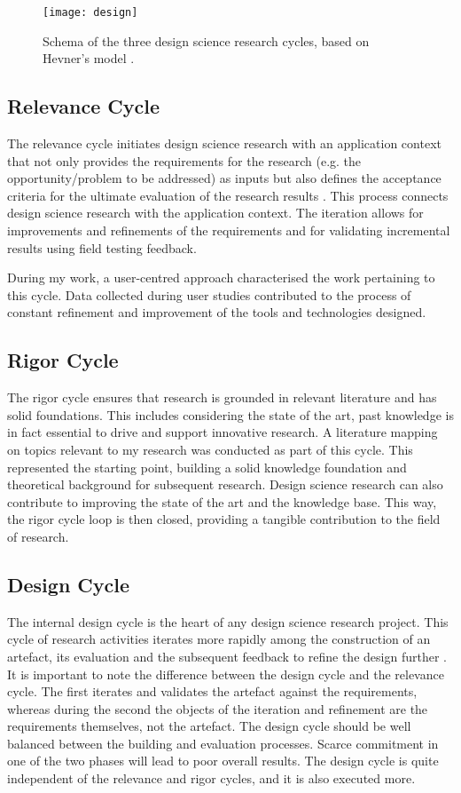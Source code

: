 \begin{figure}[ptb]
    \centering 
	\texttt{[image: design]}
	\caption{Schema of the three design science research cycles, based on Hevner's model \autocite*{hevner_three_2007}.}
	\label{fig:design-cycles}
\end{figure}


\subsection{Relevance Cycle}
The relevance cycle initiates design science research with an application context that not only provides the requirements for the research (e.g. the opportunity/problem to be addressed) as inputs but also defines the acceptance criteria for the ultimate evaluation of the research results \autocite{hevner_design_2010}.
This process connects design science research with the application context. The iteration allows for improvements and refinements of the requirements and for validating incremental results using field testing feedback.

During my work, a user-centred approach characterised the work pertaining to this cycle. Data collected during user studies contributed to the process of constant refinement and improvement of the tools and technologies designed.

\subsection{Rigor Cycle}
The rigor cycle ensures that research is grounded in relevant literature and has solid foundations. This includes considering the state of the art, past knowledge is in fact essential to drive and support innovative research. A literature mapping on topics relevant to my research was conducted as part of this cycle. This represented the starting point, building a solid knowledge foundation and theoretical background for subsequent research.
Design science research can also contribute to improving the state of the art and the knowledge base. This way, the rigor cycle loop is then closed, providing a tangible contribution to the field of research.

\subsection{Design Cycle}
The internal design cycle is the heart of any design science research project. This cycle of research activities iterates more rapidly among the construction of an artefact, its evaluation and the subsequent feedback to refine the design further \autocite{hevner_design_2010}.
It is important to note the difference between the design cycle and the relevance cycle. The first iterates and validates the artefact against the requirements, whereas during the second the objects of the iteration and refinement are the requirements themselves, not the artefact.
The design cycle should be well balanced between the building and evaluation processes. Scarce commitment in one of the two phases will lead to poor overall results.
The design cycle is quite independent of the relevance and rigor cycles, and it is also executed more.


